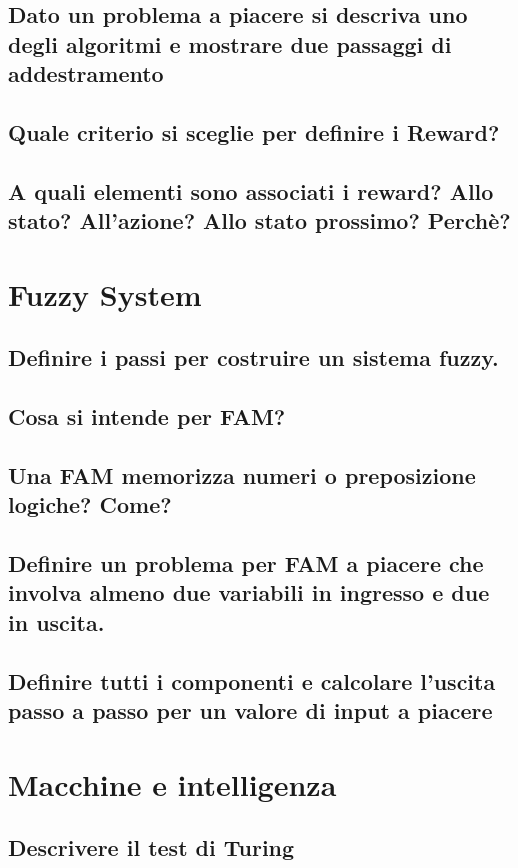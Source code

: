 \documentclass[\main/main.tex]{subfiles}
\begin{document}
\subsection{Dato un problema a piacere si descriva uno degli algoritmi e mostrare due passaggi di addestramento}
\subsection{Quale criterio si sceglie per definire i Reward?}
\subsection{A quali elementi sono associati i reward? Allo stato? All'azione? Allo stato prossimo? Perchè?}

\section{Fuzzy System}

\subsection{Definire i passi per costruire un sistema fuzzy.}
\subsection{Cosa si intende per FAM?}
\subsection{Una FAM memorizza numeri o preposizione logiche? Come?}
\subsection{Definire un problema per FAM a piacere che involva almeno due variabili in ingresso e due in uscita.}
\subsection{Definire tutti i componenti e calcolare l'uscita passo a passo per un valore di input a piacere}

\section{Macchine e intelligenza}

\subsection{Descrivere il test di Turing}
\end{document}
